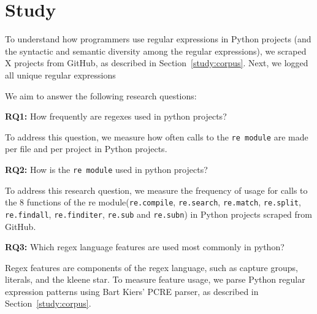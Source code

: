 \section{Study}
\label{sec:study}


To understand how programmers use regular expressions in Python projects (and the syntactic and semantic diversity among the regular expressions), we scraped X projects from GitHub, as described in Section~\ref{study:corpus}. Next, we logged all unique regular expressions

We aim to answer the following research questions:

\textbf{RQ1:} How frequently are regexes used in python projects?

To address this question, we measure how often calls to the {\tt re module} are made per file and per project in Python projects.


\textbf{RQ2:} How is the {\tt re module}  used in python projects?

To address this research question, we measure the frequency of usage for calls to the 8 functions  of the re module({\tt re.compile}, {\tt re.search}, {\tt re.match}, {\tt re.split}, {\tt re.findall}, {\tt re.finditer}, {\tt re.sub} and {\tt re.subn}) in Python projects scraped from GitHub.
%

\textbf{RQ3:} Which regex language features are used most commonly in python?

Regex features are components of the regex language, such as capture groups, literals, and the kleene star. To measure feature usage, we parse Python regular expression patterns using Bart Kiers' PCRE parser, as described in Section~\ref{study:corpus}.

